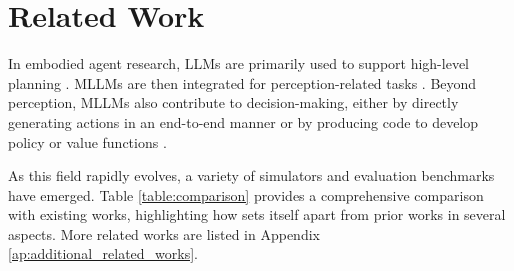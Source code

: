 \section{Related Work}




In embodied agent research, LLMs are primarily used to support high-level planning \cite{ahn2022can, huang2022language, huang2022inner, yao2022react, huang2023grounded, rana2023sayplan, chen2023robogpt, gao2024physically}. MLLMs are then integrated for perception-related tasks \cite{ViStruct2023, actionpatch2023, gao2024physically}. Beyond perception, MLLMs also contribute to decision-making, either by directly generating actions in an end-to-end manner \cite{shridhar2022cliport, driess2023palm, du2023video, mu2024embodiedgpt} or by producing code to develop policy or value functions \cite{liang2023code, huang2023voxposer}.


As this field rapidly evolves, a variety of simulators \cite{kolve2017ai2, shridhar2020alfred, xiang2020sapien, li2021igibson, li2023behavior} and evaluation benchmarks \cite{shridhar2020alfworld,shridhar2020alfred,james2020rlbench,zheng2022vlmbench,szot2023large,liu2023agentbench,liu2024visualagentbench,choi2024lota,li2024embodied,zhang2024vlabench,cheng2025embodiedeval} have emerged. Table \ref{table:comparison} provides a comprehensive comparison with existing works, highlighting how \name sets itself apart from prior works in several aspects. More related works are listed in Appendix \ref{ap:additional_related_works}.



